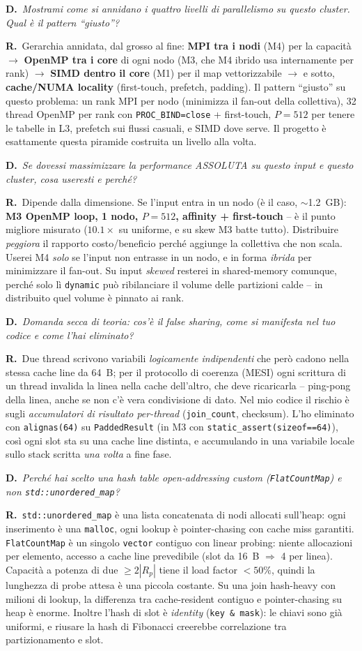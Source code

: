 \documentclass[11pt,a4paper]{article}
\newcommand{\D}[1]{\begin{dom}\small\textbf{D.}\ \itshape #1\end{dom}}
\newcommand{\R}{\noindent\textbf{R.}\ }
\begin{document}
\D{Mostrami come si annidano i quattro livelli di parallelismo su questo cluster. Qual è il pattern ``giusto''?}
\R Gerarchia annidata, dal grosso al fine: \textbf{MPI tra i nodi} (M4) per la capacità $\to$ \textbf{OpenMP tra i core} di ogni nodo (M3, che M4 ibrido usa internamente per rank) $\to$ \textbf{SIMD dentro il core} (M1) per il map vettorizzabile $\to$ e sotto, \textbf{cache/NUMA locality} (first-touch, prefetch, padding). Il pattern ``giusto'' su questo problema: un rank MPI per nodo (minimizza il fan-out della collettiva), 32 thread OpenMP per rank con \texttt{PROC\_BIND=close} + first-touch, $P=512$ per tenere le tabelle in L3, prefetch sui flussi casuali, e SIMD dove serve. Il progetto è esattamente questa piramide costruita un livello alla volta.

\D{Se dovessi massimizzare la performance ASSOLUTA su questo input e questo cluster, cosa useresti e perché?}
\R Dipende dalla dimensione. Se l'input entra in un nodo (è il caso, $\sim$1.2~GB): \textbf{M3 OpenMP loop, 1 nodo, $P=512$, affinity + first-touch} -- è il punto migliore misurato ($10.1\times$ su uniforme, e su skew M3 batte tutto). Distribuire \emph{peggiora} il rapporto costo/beneficio perché aggiunge la collettiva che non scala. Userei M4 \emph{solo} se l'input non entrasse in un nodo, e in forma \emph{ibrida} per minimizzare il fan-out. Su input \emph{skewed} resterei in shared-memory comunque, perché solo lì \texttt{dynamic} può ribilanciare il volume delle partizioni calde -- in distribuito quel volume è pinnato ai rank.

\D{Domanda secca di teoria: cos'è il false sharing, come si manifesta nel tuo codice e come l'hai eliminato?}
\R Due thread scrivono variabili \emph{logicamente indipendenti} che però cadono nella stessa cache line da 64~B; per il protocollo di coerenza (MESI) ogni scrittura di un thread invalida la linea nella cache dell'altro, che deve ricaricarla -- ping-pong della linea, anche se non c'è vera condivisione di dato. Nel mio codice il rischio è sugli \emph{accumulatori di risultato per-thread} (\texttt{join\_count}, checksum). L'ho eliminato con \texttt{alignas(64)} su \texttt{PaddedResult} (in M3 con \texttt{static\_assert(sizeof==64)}), così ogni slot sta su una cache line distinta, e accumulando in una variabile locale sullo stack scritta \emph{una volta} a fine fase.

\D{Perché hai scelto una hash table open-addressing custom (\texttt{FlatCountMap}) e non \texttt{std::unordered\_map}?}
\R \texttt{std::unordered\_map} è una lista concatenata di nodi allocati sull'heap: ogni inserimento è una \texttt{malloc}, ogni lookup è pointer-chasing con cache miss garantiti. \texttt{FlatCountMap} è un singolo \texttt{vector} contiguo con linear probing: niente allocazioni per elemento, accesso a cache line prevedibile (slot da 16~B $\Rightarrow$ 4 per linea). Capacità a potenza di due $\ge 2|R_p|$ tiene il load factor $<50\%$, quindi la lunghezza di probe attesa è una piccola costante. Su una join hash-heavy con milioni di lookup, la differenza tra cache-resident contiguo e pointer-chasing su heap è enorme. Inoltre l'hash di slot è \emph{identity} (\texttt{key \& mask}): le chiavi sono già uniformi, e riusare la hash di Fibonacci creerebbe correlazione tra partizionamento e slot.
\end{document}
